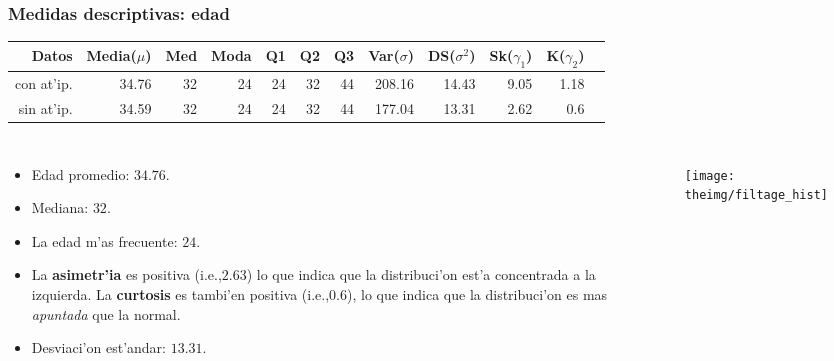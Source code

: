 \documentclass{beamer}
\begin{document}
\begin{frame}[label=mdedad]
\frametitle{Medidas descriptivas: edad}
\begin{table}[ht]
\centering
\begin{tiny}
\begin{tabular}{|r|r|r|r|r|r|r|r|r|r|r|r|} \hline
Datos & Media($\mu$) & Med & Moda & Q1 & Q2 & Q3 & Var($\sigma$) & DS($\sigma^2$) & Sk($\gamma_1$) & K($\gamma_2$)\\ [0.5ex]\hline
con at'ip. & 34.76 & 32 & 24 & 24 & 32 & 44 & 208.16 & 14.43 & 9.05 & 1.18\\\hline
sin at'ip. & 34.59 & 32 & 24 & 24 & 32 & 44 & 177.04 & 13.31 & 2.62 & 0.6\\\hline
\end{tabular}
\end{tiny}
\end{table}
\begin{columns}[T]
\begin{itemize}
\item Edad promedio: $34.76$.
\item Mediana: $32$.
\item La edad m'as frecuente: $24$.
\item La \textbf{asimetr'ia} es positiva (i.e.,$2.63$) lo que indica que la distribuci'on est'a concentrada a la izquierda.
La \textbf{curtosis} es tambi'en positiva (i.e.,$0.6$), lo que indica que la distribuci'on es mas \textit{apuntada} que la normal.
\item Desviaci'on est'andar: $13.31$. %

\end{itemize}

\begin{figure}[h]
    \texttt{[image: theimg/filtage\_hist]}
\end{figure}
\end{columns}

\end{frame}
\end{document}
